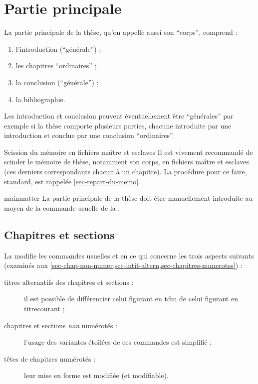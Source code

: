 \chapter{Partie principale}\label{cha-corps}
%

La partie principale de la thèse, qu'on appelle aussi son \enquote{corps},
comprend :
\begin{enumerate}
\item{}%
 l'introduction (\enquote{générale}) ;
\item{}%
  les chapitres \enquote{ordinaires} ;
\item{}%
  la conclusion (\enquote{générale}) ;
\item{}%
  la bibliographie.
\end{enumerate}
Les introduction et conclusion peuvent éventuellement être
\enquote{générales} par exemple si la thèse comporte plusieurs
parties, chacune introduite par une introduction et conclue par
une conclusion \enquote{ordinaires}.

\begin{dbremark}{Scission du mémoire en fichiers maître et esclaves}{}
  Il est vivement recommandé de scinder le mémoire de thèse,
  notamment son corps, en fichiers maître et esclaves (ces derniers
  correspondants chacun à un chapitre). La procédure
  pour ce faire, standard, est rappelée \vref{sec-repart-du-memo}.
\end{dbremark}

\begin{docCommand}[doc description=\mandatory]{mainmatter}{}
  La partie principale de la thèse doit être manuellement introduite au moyen
  de la commande usuelle  de la
  \nofrontmatter.
\end{docCommand}

\section{Chapitres et sections}

La \yatCl{} modifie les commandes usuelles  et
 en ce qui concerne les trois aspects suivants (examinés
aux \vref{sec-chap-non-numer,sec-intit-altern,sec-chapitres-numerotes}) :
\begin{description}
\item[titres alternatifs des chapitres et sections :] il est possible de
  différencier celui figurant en \gls{tdm} de celui figurant en
  \gls{titrecourant} ;
\item[chapitres et sections \emph{non} numérotés :] l'usage des variantes
  étoilées de ces commandes est simplifié ;
\item[têtes de chapitres numérotés :] leur mise en forme est modifiée (et
  modifiable).
\end{description}

